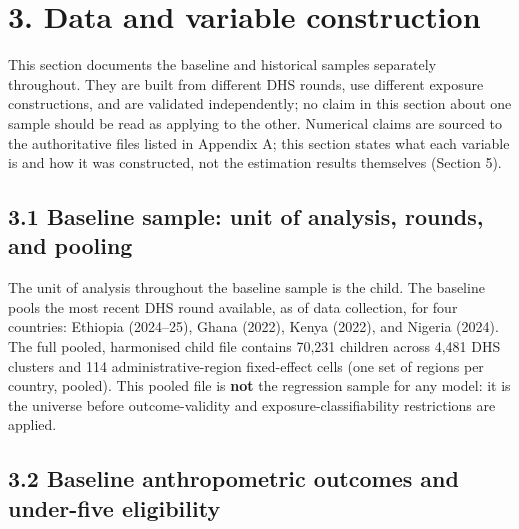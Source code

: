 \section*{3. Data and variable construction}

This section documents the baseline and historical samples separately throughout. They are built from different DHS rounds, use different exposure constructions, and are validated independently; no claim in this section about one sample should be read as applying to the other. Numerical claims are sourced to the authoritative files listed in Appendix A; this section states what each variable is and how it was constructed, not the estimation results themselves (Section 5).

\subsection*{3.1 Baseline sample: unit of analysis, rounds, and pooling}

The unit of analysis throughout the baseline sample is the child. The baseline pools the most recent DHS round available, as of data collection, for four countries: Ethiopia (2024--25), Ghana (2022), Kenya (2022), and Nigeria (2024). The full pooled, harmonised child file contains 70,231 children across 4,481 DHS clusters and 114 administrative-region fixed-effect cells (one set of regions per country, pooled). This pooled file is \textbf{not} the regression sample for any model: it is the universe before outcome-validity and exposure-classifiability restrictions are applied.

\subsection*{3.2 Baseline anthropometric outcomes and under-five eligibility}

